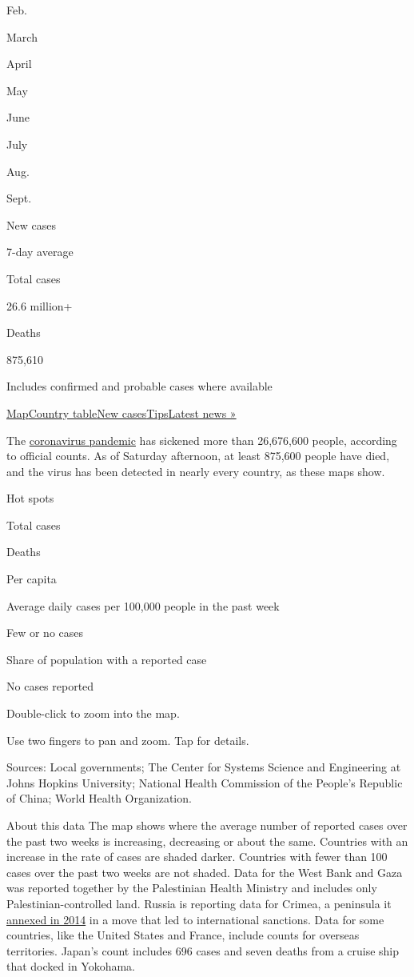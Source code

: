 Feb.

March

April

May

June

July

Aug.

Sept.

New cases

7-day average

Total cases

26.6 million+

Deaths

875,610

Includes confirmed and probable cases where available

\protect\hyperlink{map}{Map}\protect\hyperlink{countries}{Country
table}\protect\hyperlink{cases}{New
cases}\protect\hyperlink{tips}{Tips}\href{https://www.nytimes3xbfgragh.onion/2020/09/05/world/covid-19-coronavirus.html}{Latest
news »}

The
\href{https://www.nytimes3xbfgragh.onion/article/prepare-for-coronavirus.html}{coronavirus
pandemic} has sickened more than 26,676,600 people, according to
official counts. As of Saturday afternoon, at least 875,600 people have
died, and the virus has been detected in nearly every country, as these
maps show.

Hot spots

Total cases

Deaths

Per capita

Average daily cases per 100,000 people in the past week

Few or no cases

Share of population with a reported case

No cases reported

Double-click to zoom into the map.

Use two fingers to pan and zoom. Tap for details.

Sources: Local governments; The Center for Systems Science and
Engineering at Johns Hopkins University; National Health Commission of
the People's Republic of China; World Health Organization.

About this data The map shows where the average number of reported cases
over the past two weeks is increasing, decreasing or about the same.
Countries with an increase in the rate of cases are shaded darker.
Countries with fewer than 100 cases over the past two weeks are not
shaded. Data for the West Bank and Gaza was reported together by the
Palestinian Health Ministry and includes only Palestinian-controlled
land. Russia is reporting data for Crimea, a peninsula it
\href{https://www.nytimes3xbfgragh.onion/2014/03/19/world/europe/ukraine.html}{annexed
in 2014} in a move that led to international sanctions. Data for some
countries, like the United States and France, include counts for
overseas territories. Japan's count includes 696 cases and seven deaths
from a cruise ship that docked in Yokohama.

